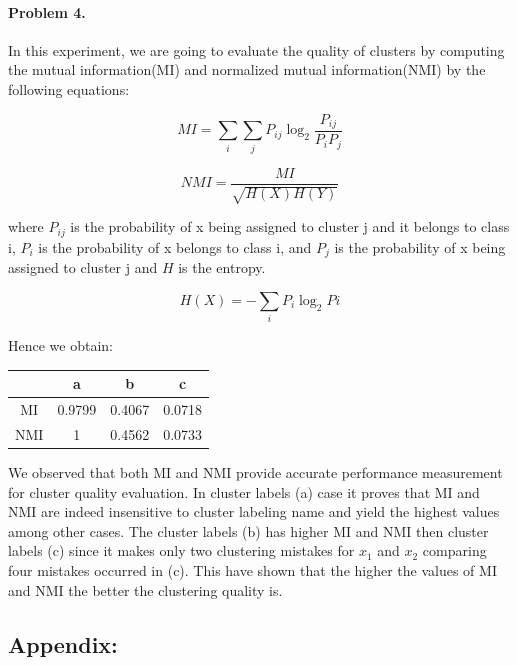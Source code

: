 \documentclass[a4paper]{article}
\begin{document}
\paragraph{Problem 4.} In this experiment, we are going to evaluate the quality of clusters by computing the mutual information(MI) and normalized mutual information(NMI) by the following equations:

\begin{equation}
	MI = \sum_i \sum_j P_{ij} \log_2 \frac{P_{ij}}{P_iP_j}
\end{equation}

\begin{equation}
	NMI = \frac{MI}{\sqrt{H(X)H(Y)}}
\end{equation}

where $P_{ij}$ is the probability of x being assigned to cluster j and it belongs to class i, $P_i$ is the probability of x belongs to class i, and $P_j$ is the probability of x being assigned to cluster j and $H$ is the entropy.

\begin{equation}
	H(X) = -\sum_i P_i \log_2 Pi
\end{equation}

Hence we obtain:

\begin{center}
    \begin{tabular}{ |c |c |c |c | }
      \hline
       & a & b & c \\ \hline
       MI & 0.9799 & 0.4067 & 0.0718 \\ \hline
       NMI & 1 & 0.4562 & 0.0733 \\ \hline
    \end{tabular}
\end{center}

We observed that both MI and NMI provide accurate performance measurement for cluster quality evaluation. In cluster labels (a) case it proves that MI and NMI are indeed insensitive to cluster labeling name and yield the highest values among other cases. The cluster labels (b) has higher MI and NMI then cluster labels (c) since it makes only two clustering mistakes for $x_1$ and $x_2$ comparing four mistakes occurred in (c). This have shown that the higher the values of MI and NMI the better the clustering quality is.

\newpage
\subsection*{Appendix:}
	
	
	
	
	
	
	
	
\end{document}
